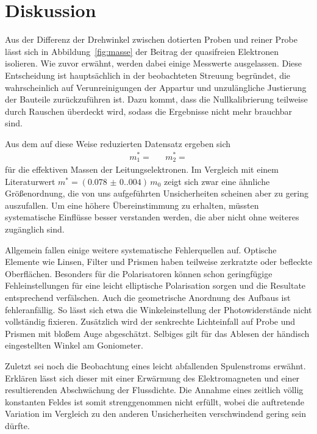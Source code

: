 \section{Diskussion}
\label{sec:diskussion}

Aus der Differenz der Drehwinkel zwischen dotierten Proben und reiner Probe lässt sich in Abbildung~\ref{fig:masse} der
Beitrag der quasifreien Elektronen isolieren. Wie zuvor erwähnt, werden dabei einige Messwerte ausgelassen. Diese Entscheidung ist
hauptsächlich in der beobachteten Streuung begründet, die wahrscheinlich auf Verunreinigungen der Appartur und unzulängliche
Justierung der Bauteile zurückzuführen ist. Dazu kommt, dass die Nullkalibrierung teilweise durch Rauschen überdeckt wird,
sodass die Ergebnisse nicht mehr brauchbar sind. 

Aus dem auf diese Weise reduzierten Datensatz ergeben sich
\begin{align*}
    m^{*}_1 =  && m^{*}_2 = 
\end{align*}
für die effektiven Massen der Leitungselektronen. Im Vergleich mit einem Literaturwert $m^{*} = (\num{0.078(0.004)})\,m_0$
\cite{PhysRev.114.59} zeigt sich zwar eine ähnliche Größenordnung, die von uns aufgeführten Unsicherheiten scheinen aber
zu gering auszufallen. Um eine höhere Übereinstimmung zu erhalten, müssten systematische Einflüsse besser verstanden werden, die
aber nicht ohne weiteres zugänglich sind.

Allgemein fallen einige weitere systematische Fehlerquellen auf. Optische Elemente wie Linsen, Filter und Prismen haben teilweise
zerkratzte oder befleckte Oberflächen. Besonders für die Polarisatoren können schon geringfügige Fehleinstellungen für eine
leicht elliptische Polarisation sorgen und die Resultate entsprechend verfälschen. Auch die geometrische Anordnung des Aufbaus ist
fehleranfällig. So lässt sich etwa die Winkeleinstellung der Photowiderstände nicht vollständig fixieren. Zusätzlich wird der
senkrechte Lichteinfall auf Probe und Prismen mit bloßem Auge abgeschätzt. Selbiges gilt für das Ablesen der händisch
eingestellten Winkel am Goniometer.

Zuletzt sei noch die Beobachtung eines leicht abfallenden Spulenstroms erwähnt. Erklären lässt sich dieser mit einer Erwärmung
des Elektromagneten und einer resultierenden Abschwächung der Flussdichte. Die Annahme eines zeitlich völlig konstanten Feldes
ist somit strenggenommen nicht erfüllt, wobei die auftretende Variation im Vergleich zu den anderen Unsicherheiten
verschwindend gering sein dürfte.
